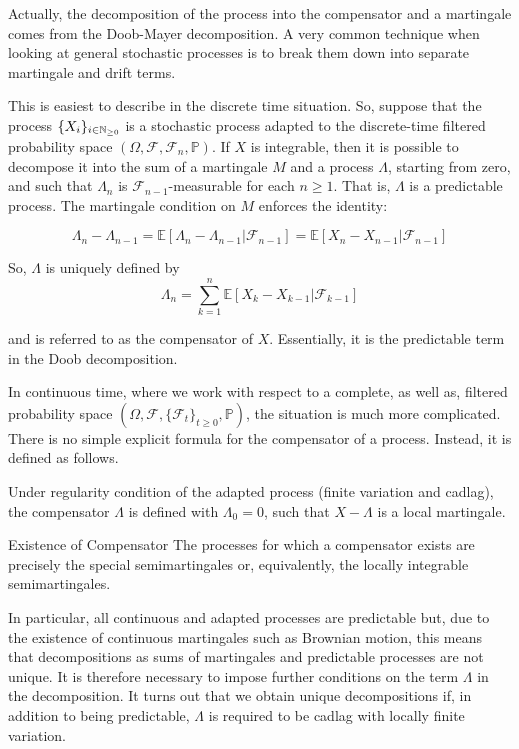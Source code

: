 Actually, the decomposition of the process into the compensator and a martingale comes from the Doob-Mayer decomposition. A very common technique when looking at general stochastic processes is to break them down into separate martingale and drift terms. 

This is easiest to describe in the discrete time situation. So, suppose that the process $\{ X_i \}_{ i \in \mathbb{N}_{\geq 0}}$  is a stochastic process adapted to the discrete-time filtered probability space  $(\Omega, \mathcal F, \mathcal F_n, \mathbb P )$. If $X$ is integrable, then it is possible to decompose it into the sum of a martingale $M$ and a process $\Lambda$, starting from zero, and such that $\Lambda_n$ is $\mathcal{F}_{n-1}$-measurable for each $n\ge1$. That is, $\Lambda$ is a predictable process. The martingale condition on $M$ enforces the identity:

\begin{equation}
\Lambda_n-\Lambda_{n-1}={\mathbb E}[\Lambda_n-\Lambda_{n-1}\vert\mathcal{F}_{n-1}]={\mathbb E}[X_n-X_{n-1}\vert\mathcal{F}_{n-1}]
\end{equation}

So, $\Lambda$ is uniquely defined by
\begin{equation}
\Lambda_n=\sum_{k=1}^n{\mathbb E}\left[X_k-X_{k-1}\vert\mathcal{F}_{k-1}\right]
\end{equation}

and is referred to as the compensator of $X$. Essentially, it is the predictable term in the Doob decomposition.


In continuous time, where we work with respect to a complete, as well as, filtered probability space $(\Omega,\mathcal{F},\{\mathcal{F}_t\}_{t\ge0},{\mathbb P})$, the situation is much more complicated. There is no simple explicit formula for the compensator of a process. Instead, it is defined as follows.

Under regularity condition of the adapted process (finite variation and cadlag), the compensator $\Lambda $ is defined with $\Lambda_0=0$, such that $X-\Lambda$ is a local martingale. 


\begin{theoreme}{Existence of Compensator}
The processes for which a compensator exists are precisely the special semimartingales or, equivalently, the locally integrable semimartingales. 
\end{theoreme}

In particular, all continuous and adapted processes are predictable but, due to the existence of continuous martingales such as Brownian motion, this means that decompositions as sums of martingales and predictable processes are not unique. It is therefore necessary to impose further conditions on the term $\Lambda$ in the decomposition. It turns out that we obtain unique decompositions if, in addition to being predictable, $\Lambda$ is required to be cadlag with locally finite variation. 

